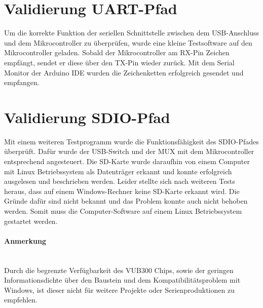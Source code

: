 \section{Validierung UART-Pfad}

Um die korrekte Funktion der seriellen Schnittstelle zwischen dem USB-Anschluss und dem Mikrocontroller zu überprüfen, wurde eine kleine Testsoftware auf den Mikrocontroller geladen. Sobald der Mikrocontroller am RX-Pin Zeichen empfängt, sendet	er diese über den TX-Pin wieder zurück. Mit dem Serial Monitor der Arduino IDE wurden die Zeichenketten erfolgreich gesendet und empfangen.

\section{Validierung SDIO-Pfad}

Mit einem weiteren Testprogramm wurde die Funktionsfähigkeit des SDIO-Pfades überprüft. Dafür wurde der USB-Switch und der MUX mit dem Mikrocontroller entsprechend angesteuert. Die SD-Karte wurde daraufhin von einem Computer mit Linux Betriebssystem als Datenträger erkannt und konnte erfolgreich ausgelesen und beschrieben werden. Leider stellte sich nach weiteren Tests heraus, dass auf einem Windows-Rechner keine SD-Karte erkannt wird. Die Gründe dafür sind nicht bekannt und das Problem konnte auch nicht behoben werden. Somit muss die Computer-Software auf einem Linux Betriebssystem gestartet werden.
\paragraph{Anmerkung}$ $\\
Durch die begrenzte Verfügbarkeit des VUB300 Chips, sowie der geringen Informationsdichte über den Baustein und dem Kompatibilitätsproblem mit Windows, ist dieser nicht für weitere Projekte oder Serienproduktionen zu empfehlen.